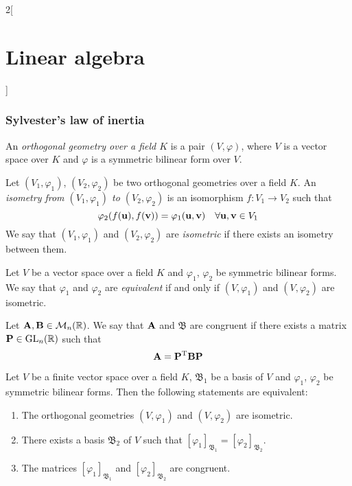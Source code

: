 \documentclass[../../../main.tex]{subfiles}
\begin{document}
\begin{multicols}{2}[\section{Linear algebra}]
  \subsubsection*{Sylvester's law of inertia}
  \begin{definition}
    An \textit{orthogonal geometry over a field $K$} is a pair $(V,\varphi)$, where $V$ is a vector space over $K$ and $\varphi$ is a symmetric bilinear form over $V$.
  \end{definition}
  \begin{definition}\label{isometry}
    Let $(V_1,\varphi_1)$, $(V_2,\varphi_2)$ be two orthogonal geometries over a field $K$. An \textit{isometry from $(V_1,\varphi_1)$ to $(V_2,\varphi_2)$} is an isomorphism $f:V_1\rightarrow V_2$ such that $$\varphi_2(f(\vb{u}),f(\vb{v}))=\varphi_1(\vb{u},\vb{v})\quad\forall\vb{u},\vb{v}\in V_1$$ We say that $(V_1,\varphi_1)$ and $(V_2,\varphi_2)$ are \textit{isometric} if there exists an isometry between them.
  \end{definition}
  \begin{definition}
    Let $V$ be a vector space over a field $K$ and $\varphi_1$, $\varphi_2$ be symmetric bilinear forms. We say that $\varphi_1$ and $\varphi_2$ are \textit{equivalent} if and only if $(V,\varphi_1)$ and $(V,\varphi_2)$ are isometric.
  \end{definition}
  \begin{definition}
    Let $\vb{A},\vb{B}\in\mathcal{M}_n(\mathbb{R})$. We say that $\vb{A}$ and $\mathfrak{B}$ are congruent if there exists a matrix $\vb{P}\in\mathrm{GL}_n(\mathbb{R})$ such that $$\vb{A}=\vb{P}^{\mathrm{T}}\vb{B}\vb{P}$$
  \end{definition}
  \begin{prop}
    Let $V$ be a finite vector space over a field $K$, $\mathfrak{B}_1$ be a basis of $V$ and $\varphi_1$, $\varphi_2$ be symmetric bilinear forms. Then the following statements are equivalent:
    \begin{enumerate}
      \item The orthogonal geometries $(V,\varphi_1)$ and $(V,\varphi_2)$ are isometric.
      \item There exists a basis $\mathfrak{B}_2$ of $V$ such that $[\varphi_1]_{\mathfrak{B}_1}=[\varphi_2]_{\mathfrak{B}_2}$.
      \item The matrices $[\varphi_1]_{\mathfrak{B}_1}$ and $[\varphi_2]_{\mathfrak{B}_2}$ are congruent.
    \end{enumerate}

\end{prop}
\end{multicols}
\end{document}
